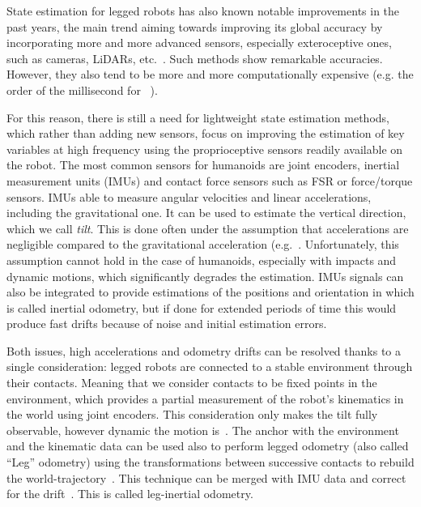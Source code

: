\documentclass{IJCAS}
\begin{document}
State estimation for legged robots has also known notable improvements in the past years, the main trend aiming towards improving its global accuracy by incorporating more and more advanced sensors, especially exteroceptive ones, such as cameras, LiDARs, etc.~\cite{wisth2022vilens, fallon2018AccRobLocWalkRobotsImuVisLidar, Kuang2024TightlyCoupledLidarImuUwb}. Such methods show remarkable accuracies. However, they also tend to be more and more computationally expensive (e.g. the order of the millisecond for ~\cite{Kuang2024TightlyCoupledLidarImuUwb}).

For this reason, there is still a need for lightweight state estimation methods, which rather than adding new sensors, focus on improving the estimation of key variables at high frequency using the proprioceptive sensors readily available on the robot. The most common sensors for humanoids are joint encoders, inertial measurement units (IMUs) and contact force sensors such as FSR or force/torque sensors. IMUs able to measure angular velocities and linear accelerations, including the gravitational one. It can be used to estimate the vertical direction, which we call \emph{tilt}. This is done often under the assumption that accelerations are negligible compared to the gravitational acceleration (e.g.~\cite{mahony2008NonlinearComplementaryFiltersOnSO3}. Unfortunately, this assumption cannot hold in the case of humanoids, especially with impacts and dynamic motions, which significantly degrades the estimation. IMUs signals can also be integrated to provide estimations of the positions and orientation in which is called inertial odometry, but if done for extended periods of time this would produce fast drifts because of noise and initial estimation errors.

Both issues, high accelerations and odometry drifts can be resolved thanks to a single consideration: legged robots are connected to a stable environment through their contacts. Meaning that we consider contacts to be fixed points in the environment, which provides a partial measurement of the robot's kinematics in the world using joint encoders. This consideration only makes the tilt fully observable, however dynamic the motion is~\cite{benallegue2020LyapunovStableOrientationEstimatorHumanoids}. The anchor with the environment and the kinematic data can be used also to perform legged odometry (also called ``Leg'' odometry) using the transformations between successive contacts to rebuild the world-trajectory~\cite{Lin2005ALegConfigurationMeasSystemHexapod}. This technique can be merged with IMU data and correct for the drift~\cite{bloesch2013FusionLegKineAndImu, Wawrzynski2015RobustEstVelocityTilt, masuya2015DeadReckoningAnchoringPivot}. This is called leg-inertial odometry.
\end{document}
